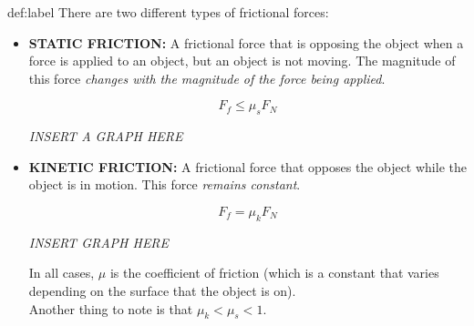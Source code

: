 	
\begin{definition}{def:label}
	There are two different types of frictional forces:

	\begin{itemize}
		\item \textbf{STATIC FRICTION:} A frictional force that is opposing the object when a force is applied to an object, but an object is not moving. The magnitude of this force \textit{changes with the magnitude of the force being applied}.
		
		$$F_{f} \le \mu_s F_N$$

		\textit{INSERT A GRAPH HERE}

		\item \textbf{KINETIC FRICTION:} A frictional force that opposes the object while the object is in motion. This force \textit{remains constant}.
		
		$$F_{f} = \mu_k F_N$$

		\textit{INSERT GRAPH HERE}

		In all cases, $\mu$ is the coefficient of friction (which is a constant that varies depending on the surface that the object is on).\\

		Another thing to note is that $\mu_k < \mu_s < 1$.
	\end{itemize}
\end{definition}

